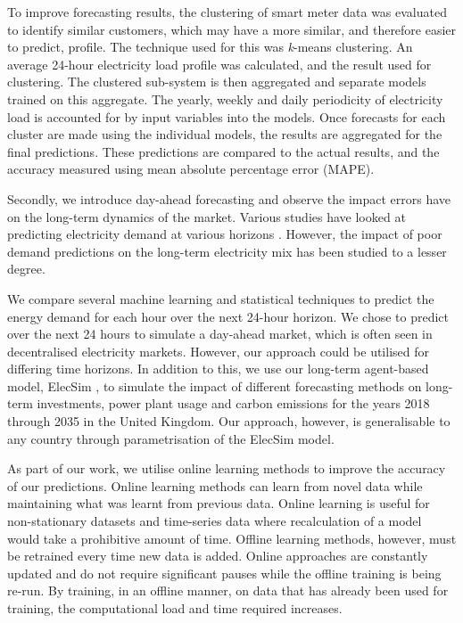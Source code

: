 To improve forecasting results, the clustering of smart meter data was evaluated to identify similar customers, which may have a more similar, and therefore easier to predict, profile. The technique used for this was \textit{k}-means clustering. An average 24-hour electricity load profile was calculated, and the result used for clustering. The clustered sub-system is then aggregated and separate models trained on this aggregate. The yearly, weekly and daily periodicity of electricity load is accounted for by input variables into the models. Once forecasts for each cluster are made using the individual models, the results are aggregated for the final predictions. These predictions are compared to the actual results, and the accuracy measured using mean absolute percentage error (MAPE).










Secondly, we introduce day-ahead forecasting and observe the impact errors have on the long-term dynamics of the market. Various studies have looked at predicting electricity demand at various horizons \cite{Andersen2013,Huang2003,Singh2012}. However, the impact of poor demand predictions on the long-term electricity mix has been studied to a lesser degree.

We compare several machine learning and statistical techniques to predict the energy demand for each hour over the next 24-hour horizon. We chose to predict over the next 24 hours to simulate a day-ahead market, which is often seen in decentralised electricity markets. However, our approach could be utilised for differing time horizons. In addition to this, we use our long-term agent-based model, ElecSim \cite{Kell, Kell2020}, to simulate the impact of different forecasting methods on long-term investments, power plant usage and carbon emissions for the years 2018 through 2035 in the United Kingdom. Our approach, however, is generalisable to any country through parametrisation of the ElecSim model.


As part of our work, we utilise online learning methods to improve the accuracy of our predictions. Online learning methods can learn from novel data while maintaining what was learnt from previous data. Online learning is useful for non-stationary datasets and time-series data where recalculation of a model would take a prohibitive amount of time. Offline learning methods, however, must be retrained every time new data is added. Online approaches are constantly updated and do not require significant pauses while the offline training is being re-run. By training, in an offline manner, on data that has already been used for training, the computational load and time required increases.

